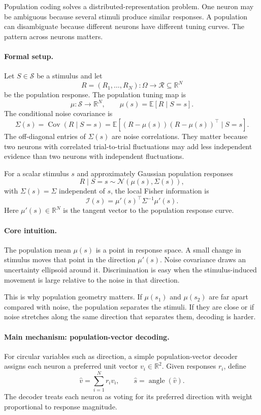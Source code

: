 Population coding solves a distributed-representation problem. One neuron may be ambiguous because several stimuli produce similar responses. A population can disambiguate because different neurons have different tuning curves. The pattern across neurons matters.

\paragraph{Formal setup.}
Let \(S\in\mathcal S\) be a stimulus and let
\[
R=(R_1,\ldots,R_N):\Omega\to\mathcal R\subseteq\mathbb R^N
\]
be the population response. The population tuning map is
\[
\boxed{
\mu:\mathcal S\to\mathbb R^N,\qquad
\mu(s)=\mathbb E[R\mid S=s].
}
\]
The conditional noise covariance is
\[
\Sigma(s)=\operatorname{Cov}(R\mid S=s)
=\mathbb E[(R-\mu(s))(R-\mu(s))^\top\mid S=s].
\]
The off-diagonal entries of \(\Sigma(s)\) are noise correlations. They matter because two neurons with correlated trial-to-trial fluctuations may add less independent evidence than two neurons with independent fluctuations.

For a scalar stimulus \(s\) and approximately Gaussian population responses
\[
R\mid S=s\sim\mathcal N(\mu(s),\Sigma(s)),
\]
with \(\Sigma(s)=\Sigma\) independent of \(s\), the local Fisher information is
\[
\boxed{
\mathcal I(s)=\mu'(s)^\top \Sigma^{-1}\mu'(s).
}
\]
Here \(\mu'(s)\in\mathbb R^N\) is the tangent vector to the population response curve.

\paragraph{Core intuition.}
The population mean \(\mu(s)\) is a point in response space. A small change in stimulus moves that point in the direction \(\mu'(s)\). Noise covariance draws an uncertainty ellipsoid around it. Discrimination is easy when the stimulus-induced movement is large relative to the noise in that direction.

This is why population geometry matters. If \(\mu(s_1)\) and \(\mu(s_2)\) are far apart compared with noise, the population separates the stimuli. If they are close or if noise stretches along the same direction that separates them, decoding is harder.

\paragraph{Main mechanism: population-vector decoding.}
For circular variables such as direction, a simple population-vector decoder assigns each neuron a preferred unit vector \(v_i\in\mathbb R^2\). Given responses \(r_i\), define
\[
\boxed{
\widehat v=\sum_{i=1}^N r_i v_i,
\qquad
\widehat s=\operatorname{angle}(\widehat v).
}
\]
The decoder treats each neuron as voting for its preferred direction with weight proportional to response magnitude.

